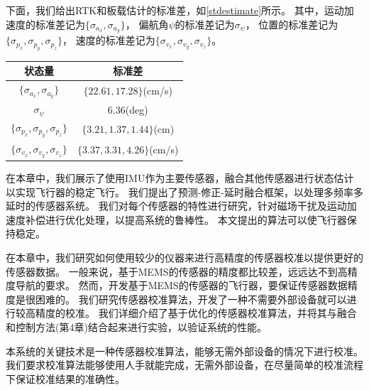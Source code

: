 \documentclass[
  type=master
]{gdutthesis}
\begin{document}
下面，我们给出RTK和板载估计的标准差，如\autoref{stdestimate}所示。
其中，运动加速度的标准差记为$\big\{ \sigma_{a_x},\sigma_{a_y} \big\}$，
偏航角$\psi$的标准差记为$\sigma_{\psi}$，
位置的标准差记为$\big\{ \sigma_{p_x},\sigma_{p_y},\sigma_{p_z} \big\}$，
速度的标准差记为$\big\{ \sigma_{v_x},\sigma_{v_y},\sigma_{v_z} \big\}$。

\begin{table}[htbp]
	\label{stdestimate}
	\begin{tabular}{cc}
		\toprule
		状态量 & 标准差 \\
		\midrule
		$\big\{ \sigma_{a_x},\sigma_{a_y} \big\}$ & $\big\{ 22.61, 17.28 \big\}$(cm/s) \\
		$\sigma_{\psi}$ & $6.36$(deg)   \\
		$\big\{ \sigma_{p_x},\sigma_{p_y},\sigma_{p_z} \big\}$ & $\big\{ 3.21, 1.37, 1.44 \big\}$(cm)   \\
		$\big\{ \sigma_{v_x},\sigma_{v_y},\sigma_{v_z} \big\}$ & $\big\{ 3.37, 3.31, 4.26 \big\}$(cm/s)   \\
		\bottomrule
	\end{tabular}
\end{table}



在本章中，我们展示了使用IMU作为主要传感器，融合其他传感器进行状态估计以实现飞行器的稳定飞行。
我们提出了预测-修正-延时融合框架，以处理多频率多延时的传感器系统。
我们对每个传感器的特性进行研究，针对磁场干扰及运动加速度补偿进行优化处理，以提高系统的鲁棒性。
本文提出的算法可以使飞行器保持稳定。

在本章中，我们研究如何使用较少的仪器来进行高精度的传感器校准以提供更好的传感器数据。
一般来说，基于MEMS的传感器的精度都比较差，远远达不到高精度导航的要求。
然而，开发基于MEMS的传感器的飞行器，要保证传感器数据精度是很困难的。
我们研究传感器校准算法，开发了一种不需要外部设备就可以进行较高精度的校准。
我们详细介绍了基于优化的传感器校准算法，并将其与融合和控制方法(第4章)结合起来进行实验，以验证系统的性能。

本系统的关键技术是一种传感器校准算法，能够无需外部设备的情况下进行校准。
我们要求校准算法能够使用人手就能完成，无需外部设备，在尽量简单的校准流程下保证校准结果的准确性。
\end{document}
